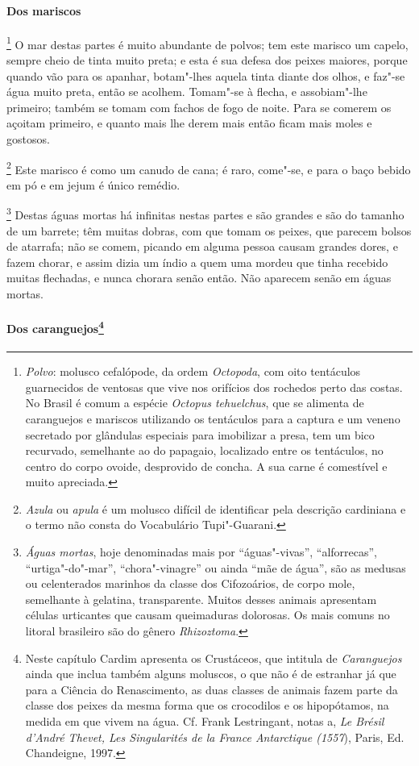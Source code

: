 \paragraph{Dos mariscos}

\footnote{ \textit{Polvo}: molusco
cefalópode, da ordem \textit{Octopoda}, com oito tentáculos guarnecidos
de ventosas que vive nos orifícios dos rochedos perto das costas. No
Brasil é comum a espécie \textit{Octopus tehuelchus}, que se alimenta
de caranguejos e mariscos utilizando os tentáculos para a captura e um
veneno secretado por glândulas especiais para imobilizar a presa, tem
um bico recurvado, semelhante ao do papagaio, localizado entre os
tentáculos, no centro do corpo ovoide, desprovido de concha. A sua
carne é comestível e muito apreciada.} O mar destas partes
é muito abundante de polvos; tem este marisco um capelo, sempre cheio
de tinta muito preta; e esta é sua defesa dos peixes maiores, porque
quando vão para os apanhar, botam"-lhes aquela tinta diante dos olhos, e
faz"-se água muito preta, então se acolhem. Tomam"-se à flecha, e
assobiam"-lhe primeiro; também se tomam com fachos de fogo de noite.
Para se comerem os açoitam primeiro, e quanto mais lhe derem mais então
ficam mais moles e gostosos.

\footnote{ \textit{Azula} ou \textit{apula} é um
molusco difícil de identificar pela descrição cardiniana e o termo não
consta do Vocabulário Tupi"-Guarani.} Este marisco é como um canudo de cana; 
é raro, come"-se, e para o baço bebido em pó e em jejum é único remédio.

\footnote{ \textit{Águas mortas}, hoje
denominadas mais por ``águas"-vivas'', ``alforrecas'', ``urtiga"-do"-mar'',
``chora"-vinagre'' ou ainda ``mãe de água'', são as medusas ou celenterados
marinhos da classe dos Cifozoários, de corpo mole, semelhante à
gelatina, transparente. Muitos desses animais apresentam células
urticantes que causam queimaduras dolorosas. Os mais comuns no litoral
brasileiro são do gênero \textit{Rhizoztoma}.} Destas águas mortas há 
infinitas nestas partes e são grandes e são do tamanho
de um barrete; têm muitas dobras, com que tomam os peixes, que parecem
bolsos de atarrafa; não se comem, picando em alguma pessoa causam
grandes dores, e fazem chorar, e assim dizia um índio a quem uma mordeu
que tinha recebido muitas flechadas, e nunca chorara senão então. Não
aparecem senão em águas mortas. 


\paragraph[Dos caranguejos]{Dos caranguejos\protect\footnote{ Neste capítulo Cardim apresenta
os Crustáceos, que intitula de \textit{Caranguejos} ainda que inclua
também alguns moluscos, o que não é de estranhar já que para a Ciência
do Renascimento, as duas classes de animais fazem parte da classe dos
peixes da mesma forma que os crocodilos e os hipopótamos, na medida em
que vivem na água. Cf. Frank Lestringant, notas a, \textit{Le Brésil
d'André Thevet, Les Singularités de la France Antarctique (1557}), Paris, Ed. Chandeigne, 1997.}}

